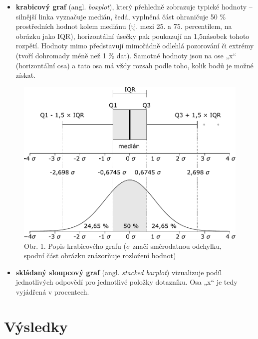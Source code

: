 \documentclass[12pt,a4paper,]{report}
\providecommand{\tightlist}{%
  \setlength{\itemsep}{0pt}\setlength{\parskip}{0pt}}
\begin{document}
\begin{itemize}
\tightlist
\item
  \textbf{krabicový graf} (angl. \emph{boxplot}), který přehledně zobrazuje typické hodnoty -- silnější linka vyznačuje medián, šedá, vyplněná část ohraničuje 50 \% prostředních hodnot kolem mediánu (tj. mezi 25. a 75. percentilem, na obrázku jako IQR), horizontální úsečky pak poukazují na 1,5násobek tohoto rozpětí. Hodnoty mimo představují mimořádně odlehlá pozorování či extrémy (tvoří dohromady méně než 1 \% dat). Samotné hodnoty jsou na ose „x`` (horizontální osa) a tato osa má vždy rozsah podle toho, kolik bodů je možné získat.
\end{itemize}

\begin{figure}
\centering
\includegraphics{figures/boxplot_description.pdf}
\caption{Obr. 1. Popis krabicového grafu (\(\sigma\) značí směrodatnou odchylku, spodní část obrázku znázorňuje rozložení hodnot)}
\end{figure}

\begin{itemize}
\tightlist
\item
  \textbf{skládaný sloupcový graf} (angl. \emph{stacked barplot}) vizualizuje podíl jednotlivých odpovědí pro jednotlivé položky dotazníku. Osa „x`` je tedy vyjádřená v procentech.
\end{itemize}

\hypertarget{vuxfdsledky}{%
\chapter{Výsledky}\label{vuxfdsledky}}
\end{document}
